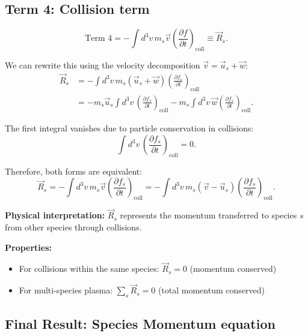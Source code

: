 \subsection*{Term 4: Collision term}

\begin{equation*}
\text{Term 4} = -\int d^3v \, m_s \vec{v} \left(\frac{\partial f}{\partial t}\right)_{\text{coll}} \equiv \vec{R}_s.
\end{equation*}

We can rewrite this using the velocity decomposition $\vec{v} = \vec{u}_s + \vec{w}$:
\begin{align*}
\vec{R}_s &= -\int d^3v \, m_s (\vec{u}_s + \vec{w}) \left(\frac{\partial f_s}{\partial t}\right)_{\text{coll}}  \\
&= -m_s \vec{u}_s \int d^3v \, \left(\frac{\partial f_s}{\partial t}\right)_{\text{coll}} - m_s \int d^3v \, \vec{w} \left(\frac{\partial f_s}{\partial t}\right)_{\text{coll}}.
\end{align*}

The first integral vanishes due to particle conservation in collisions:
\begin{equation*}
\int d^3v \, \left(\frac{\partial f_s}{\partial t}\right)_{\text{coll}} = 0.
\end{equation*}

Therefore, both forms are equivalent:
\begin{equation*}
 \vec{R}_s = -\int d^3v \, m_s \vec{v} \left(\frac{\partial f_s}{\partial t}\right)_{\text{coll}} = -\int d^3v \, m_s (\vec{v} - \vec{u}_s) \left(\frac{\partial f_s}{\partial t}\right)_{\text{coll}}.
\end{equation*}

\textbf{Physical interpretation:} $\vec{R}_s$ represents the momentum transferred to species $s$ from other species through collisions.

\textbf{Properties:}
\begin{itemize}
\item For collisions within the same species: $\vec{R}_s = 0$ (momentum conserved)
\item For multi-species plasma: $\sum_s \vec{R}_s = 0$ (total momentum conserved)
\end{itemize}

\subsection*{Final Result: Species Momentum equation}

